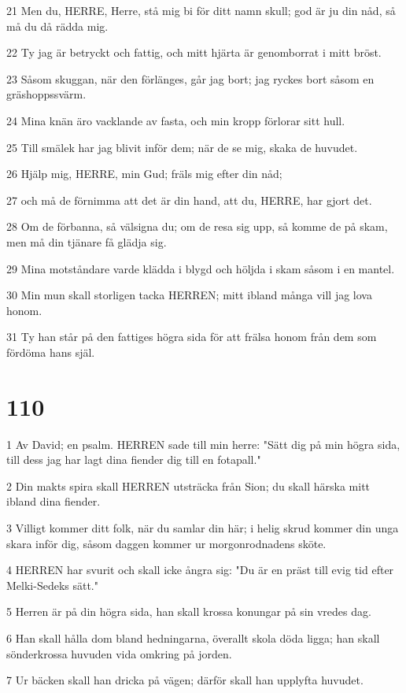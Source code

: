 \par 21 Men du, HERRE, Herre, stå mig bi för ditt namn skull; god är ju din nåd, så må du då rädda mig.
\par 22 Ty jag är betryckt och fattig, och mitt hjärta är genomborrat i mitt bröst.
\par 23 Såsom skuggan, när den förlänges, går jag bort; jag ryckes bort såsom en gräshoppssvärm.
\par 24 Mina knän äro vacklande av fasta, och min kropp förlorar sitt hull.
\par 25 Till smälek har jag blivit inför dem; när de se mig, skaka de huvudet.
\par 26 Hjälp mig, HERRE, min Gud; fräls mig efter din nåd;
\par 27 och må de förnimma att det är din hand, att du, HERRE, har gjort det.
\par 28 Om de förbanna, så välsigna du; om de resa sig upp, så komme de på skam, men må din tjänare få glädja sig.
\par 29 Mina motståndare varde klädda i blygd och höljda i skam såsom i en mantel.
\par 30 Min mun skall storligen tacka HERREN; mitt ibland många vill jag lova honom.
\par 31 Ty han står på den fattiges högra sida för att frälsa honom från dem som fördöma hans själ.

\chapter{110}

\par 1 Av David; en psalm. HERREN sade till min herre: "Sätt dig på min högra sida, till dess jag har lagt dina fiender dig till en fotapall."
\par 2 Din makts spira skall HERREN utsträcka från Sion; du skall härska mitt ibland dina fiender.
\par 3 Villigt kommer ditt folk, när du samlar din här; i helig skrud kommer din unga skara inför dig, såsom daggen kommer ur morgonrodnadens sköte.
\par 4 HERREN har svurit och skall icke ångra sig: "Du är en präst till evig tid efter Melki-Sedeks sätt."
\par 5 Herren är på din högra sida, han skall krossa konungar på sin vredes dag.
\par 6 Han skall hålla dom bland hedningarna, överallt skola döda ligga; han skall sönderkrossa huvuden vida omkring på jorden.
\par 7 Ur bäcken skall han dricka på vägen; därför skall han upplyfta huvudet.

